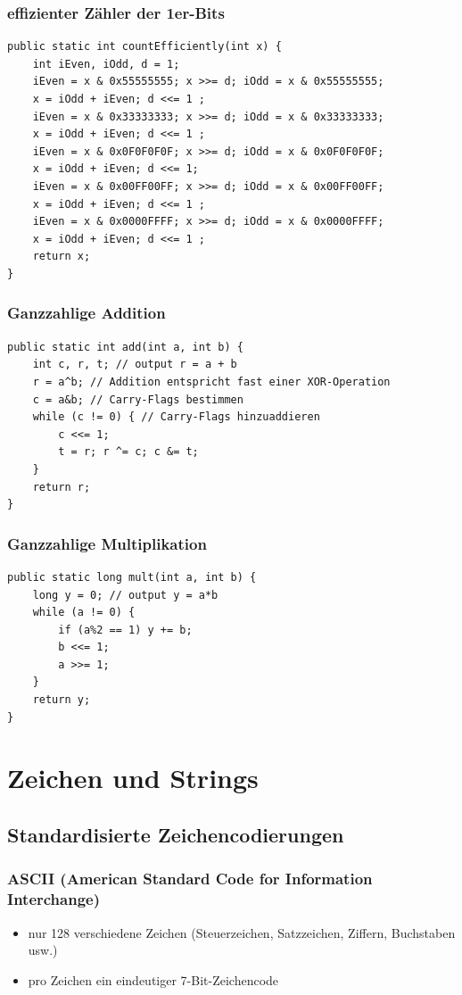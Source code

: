 \documentclass[a4paper,10pt]{article}
\begin{document}
\subsubsection{effizienter Z\"ahler der 1er-Bits}
\begin{lstlisting}
public static int countEfficiently(int x) {
	int iEven, iOdd, d = 1;
	iEven = x & 0x55555555; x >>= d; iOdd = x & 0x55555555; 
	x = iOdd + iEven; d <<= 1 ;
	iEven = x & 0x33333333; x >>= d; iOdd = x & 0x33333333; 
	x = iOdd + iEven; d <<= 1 ;	
	iEven = x & 0x0F0F0F0F; x >>= d; iOdd = x & 0x0F0F0F0F; 
	x = iOdd + iEven; d <<= 1;	
	iEven = x & 0x00FF00FF; x >>= d; iOdd = x & 0x00FF00FF; 
	x = iOdd + iEven; d <<= 1 ;
	iEven = x & 0x0000FFFF; x >>= d; iOdd = x & 0x0000FFFF; 
	x = iOdd + iEven; d <<= 1 ;	
	return x;
}
\end{lstlisting}

\subsubsection{Ganzzahlige Addition}
\begin{lstlisting}
public static int add(int a, int b) {
	int c, r, t; // output r = a + b
	r = a^b; // Addition entspricht fast einer XOR-Operation 
	c = a&b; // Carry-Flags bestimmen
	while (c != 0) { // Carry-Flags hinzuaddieren
		c <<= 1;
		t = r; r ^= c; c &= t;
	}
	return r;
}
\end{lstlisting}

\subsubsection{Ganzzahlige Multiplikation}
\begin{lstlisting}
public static long mult(int a, int b) {
	long y = 0; // output y = a*b
	while (a != 0) {
		if (a%2 == 1) y += b; 
		b <<= 1;
		a >>= 1;
	}
	return y;
}
\end{lstlisting}

\newpage
\section{Zeichen und Strings}
\subsection{Standardisierte Zeichencodierungen}
\subsubsection{ASCII (American Standard Code for Information Interchange)}
\begin{itemize}
	\item nur 128 verschiedene Zeichen (Steuerzeichen, Satzzeichen, Ziffern, Buchstaben usw.)
	\item pro Zeichen ein eindeutiger 7-Bit-Zeichencode
\end{itemize}
\end{document}
